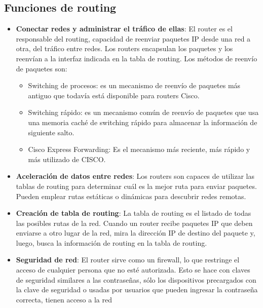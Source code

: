 \documentclass[
	12pt, %
	fleqn, %
	a4paper, %
	oneside, %
]{LegrandOrangeBook}
\begin{document}
\subsection{Funciones de routing}
\begin{itemize}
\item \textbf{Conectar redes y administrar el tráfico de ellas}: El router es el responsable del routing, capacidad de reenviar paquetes IP desde una red a otra, del tráfico entre redes. Los routers encapsulan los paquetes y los reenvían a la interfaz indicada en la tabla de routing. Los métodos de reenvío de paquetes son:
\begin{itemize}
	\item Switching de procesos: es  un mecanismo de reenvío de  paquetes más antiguo que  todavía está disponible para  routers Cisco.
	\item Switching rápido: es un  mecanismo común de reenvío  de paquetes que usa una  memoria caché de switching  rápido para almacenar la información de siguiente salto.
	\item Cisco Express Forwarding: Es el mecanismo más reciente, más rápido y más utilizado de CISCO.
\end{itemize}
\item \textbf{Aceleración de datos entre redes}: Los routers son capaces de utilizar las tablas de routing para determinar cuál es la mejor ruta para enviar paquetes. Pueden emplear rutas estáticas o dinámicas para descubrir redes remotas.
\item \textbf{Creación de tabla de routing}: La tabla de routing es el listado de todas las posibles rutas de la red. Cuando un router recibe paquetes IP que deben enviarse a otro lugar de la red, mira la dirección IP de destino del paquete y, luego, busca la información de routing en la tabla de routing.
\item \textbf{Seguridad de red}: El router sirve como un firewall, lo que restringe el acceso de cualquier persona que no esté autorizada. Esto se hace con claves de seguridad similares a las contraseñas, sólo los dispositivos precargados con la clave de seguridad o usadas por usuarios que pueden ingresar la contraseña correcta, tienen acceso a la red
\end{itemize}
\end{document}
